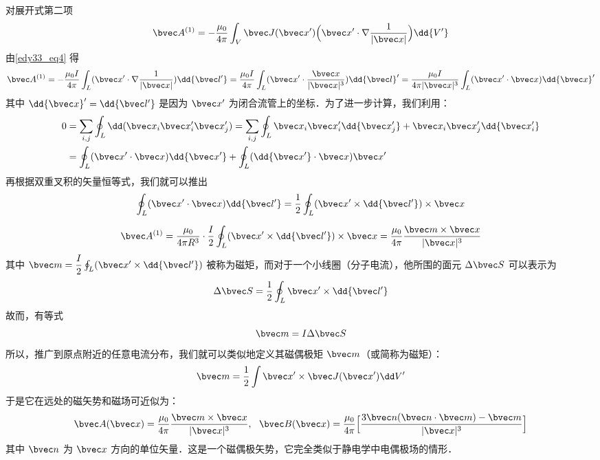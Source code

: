 对展开式第二项
\begin{equation}
\bvec A^{(1)}=-\dfrac{\mu_0 }{4\pi}\int_V \bvec J(\bvec x^{\prime})\Big (\bvec x^{\prime}\cdot\nabla\dfrac{1}{|\bvec x|}\Big)\dd{V^{\prime}}\label{edy33_eq6}
\end{equation}
由\autoref{edy33_eq4} 得
\begin{equation}
\bvec A^{(1)}=-\dfrac{\mu_0 I }{4\pi}\int_L (\bvec x^{\prime}\cdot\nabla\dfrac{1}{|\bvec x|}) \dd{\bvec l'}=\dfrac{\mu_0 I }{4\pi}\int_L (\bvec x^{\prime}\cdot\dfrac{\bvec x}{|\bvec x|^3})\dd {\bvec l}^{\prime}
=\dfrac{\mu_0 I }{4\pi|\bvec x|^3}\int_L (\bvec x^{\prime}\cdot \bvec x)\dd {\bvec x}^{\prime}
\label{edy33_eq7}
\end{equation}
其中 $\dd{\bvec x}^{\prime}=\dd{\bvec l'}$ 是因为 $ \bvec x^{\prime}$ 为闭合流管上的坐标．为了进一步计算，我们利用：
\begin{align}
0&=\sum_{i,j}\oint_L \dd(\bvec x_i \bvec x'_i \bvec x'_j)=\sum_{i,j}\oint_L \bvec x_i \bvec x'_i \dd {\bvec x'_j} + \bvec x_i \bvec x'_j \dd {\bvec x'_i} 
\label{edy33_eq8_0}
\\
&=
\oint_L (\bvec x^{\prime}\cdot\bvec x)\dd {\bvec x'}+\oint_L (\dd {\bvec x'}\cdot \bvec x)\bvec x^{\prime}\label{edy33_eq8}
\end{align}
再根据双重叉积的矢量恒等式，我们就可以推出
\begin{equation}
\oint_L (\bvec x^{\prime}\cdot \bvec x)\dd{\bvec l'}=\dfrac1 2\oint_L (\bvec x^{\prime}\times \dd{\bvec l'})\times \bvec x \label{edy33_eq9}
\end{equation}

\begin{equation}
\bvec A^{(1)}=\dfrac{\mu_0}{4\pi R^3}\cdot\dfrac{I}{2}\oint_L (\bvec x^{\prime}\times \dd{\bvec l'})\times \bvec x=\dfrac{\mu_0}{4\pi}\dfrac{\bvec m \times \bvec x}{|\bvec x|^3}\label{edy33_eq10}
\end{equation}
其中 $\bvec m =\dfrac{I}{2}\oint_L (\bvec x^{\prime}\times \dd{\bvec l'})$ 被称为磁矩，而对于一个小线圈（分子电流），他所围的面元 $\Delta\bvec S$ 可以表示为
\begin{equation}
\Delta\bvec S=\dfrac 1 2\oint_L \bvec x^{\prime}\times \dd{\bvec l'}
\end{equation}
故而，有等式
\begin{equation}
\bvec m=I\Delta \bvec S
\end{equation}
所以，推广到原点附近的任意电流分布，我们就可以类似地定义其磁偶极矩 $\bvec m$（或简称为磁矩）：
\begin{equation}
\bvec m=\frac{1}{2}\int \bvec x' \times \bvec J(\bvec x') \dd V'
\end{equation}
于是它在远处的磁矢势和磁场可近似为：
\begin{equation}
\bvec A(\bvec x)=\frac{\mu_0}{4\pi}\frac{\bvec m\times \bvec x}{|\bvec x|^3},\ \ 
\bvec B(\bvec x)=\frac{\mu_0}{4\pi}\Big [\frac{3\bvec n(\bvec n\cdot \bvec m)-\bvec m}{|\bvec x|^3}\Big]
\end{equation}
其中 $\bvec n$ 为 $\bvec x$ 方向的单位矢量．这是一个磁偶极矢势，它完全类似于静电学中电偶极场的情形．